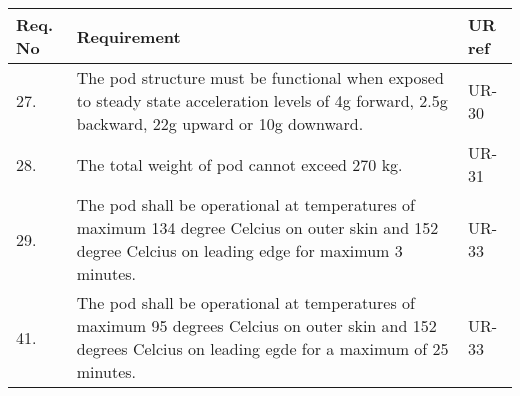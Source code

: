 \begin{center}
    \begin{tabular}{ | l | p{9cm} | l |}
    \hline 
    Req. No & Requirement  & UR ref \\ \hline
	27. & The pod structure must be functional when exposed to steady state acceleration levels of 4g forward, 2.5g backward, 22g upward or 10g downward.&UR-30\\ \hline
	28. &The total weight of pod cannot exceed 270 kg.&UR-31\\ \hline
	29. &The pod shall be operational at temperatures of maximum 134 degree Celcius on outer skin and 152 degree Celcius on leading edge for maximum 3 minutes.&UR-33\\ \hline
	41. &The pod shall be operational at temperatures of maximum 95 degrees Celcius on outer skin and 152 degrees Celcius on leading egde for a maximum of 25 minutes. &UR-33\\ 	
\hline
    \end{tabular}
\end{center}

